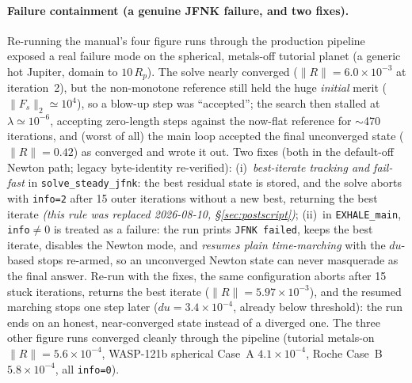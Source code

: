 \documentclass[english,a4paper]{my_memo}
\newcommand{\code}[1]{\texttt{#1}}
\begin{document}
\paragraph{Failure containment (a genuine JFNK failure, and two fixes).}
Re-running the manual's four figure runs through the production pipeline
exposed a real failure mode on the spherical, metals-off tutorial planet
(a generic hot Jupiter, domain to $10\,R_p$). The solve nearly converged
($\|R\|=6.0\times10^{-3}$ at iteration~2), but the non-monotone reference
still held the huge \emph{initial} merit ($\|F_s\|_2\simeq10^4$), so a
blow-up step was ``accepted''; the search then stalled at
$\lambda\simeq10^{-6}$, accepting zero-length steps against the
now-flat reference for $\sim$470 iterations, and (worst of all) the
main loop accepted the final unconverged state ($\|R\|=0.42$) as
converged and wrote it out. Two fixes (both in the default-off Newton
path; legacy byte-identity re-verified): (i)~\emph{best-iterate tracking
and fail-fast} in \code{solve\_steady\_jfnk}: the best residual state
is stored, and the solve aborts with \code{info=2} after 15 outer
iterations without a new best, returning the best iterate \emph{(this rule was
replaced 2026-08-10, \S\ref{sec:postscript})}; (ii)~in
\code{EXHALE\_main}, \code{info}$\ne$0 is treated as a failure: the run
prints \code{JFNK failed}, keeps the best iterate, disables the Newton
mode, and \emph{resumes plain time-marching} with the $du$-based stops
re-armed, so an unconverged Newton state can never masquerade as the
final answer. Re-run with the fixes, the same configuration aborts after
15 stuck iterations, returns the best iterate
($\|R\|=5.97\times10^{-3}$), and the resumed marching stops one step
later ($du=3.4\times10^{-4}$, already below threshold): the run ends on
an honest, near-converged state instead of a diverged one. The three
other figure runs converged cleanly through the pipeline (tutorial
metals-on $\|R\|=5.6\times10^{-4}$, WASP-121b spherical Case~A
$4.1\times10^{-4}$, Roche Case~B $5.8\times10^{-4}$, all \code{info=0}).
\end{document}
